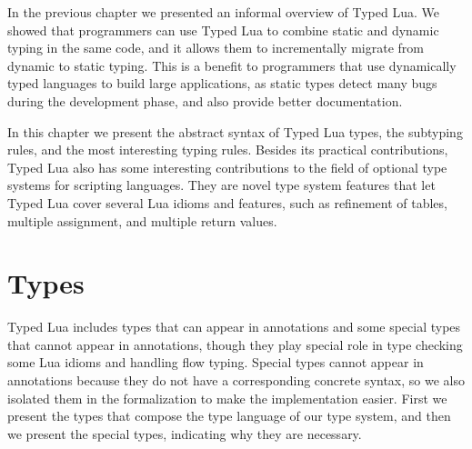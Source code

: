 
In the previous chapter we presented an informal overview of Typed Lua.
We showed that programmers can use Typed Lua to combine static and dynamic
typing in the same code, and it allows them to incrementally migrate from
dynamic to static typing.
This is a benefit to programmers that use dynamically typed languages
to build large applications, as static types detect many bugs
during the development phase, and also provide better documentation.

In this chapter we present the abstract syntax of Typed Lua types,
the subtyping rules, and the most interesting typing rules.
Besides its practical contributions, Typed Lua also has some interesting
contributions to the field of optional type systems for scripting
languages.
They are novel type system features that let Typed Lua cover several Lua idioms
and features, such as refinement of tables, multiple assignment, and multiple return values.

\section{Types}
\label{sec:types}

Typed Lua includes types that can appear in annotations and some
special types that cannot appear in annotations, though they
play special role in type checking some Lua idioms and handling flow typing.
Special types cannot appear in annotations because they do not have
a corresponding concrete syntax, so we also isolated them in the
formalization to make the implementation easier.
First we present the types that compose the type language of our
type system, and then we present the special types, indicating
why they are necessary.

